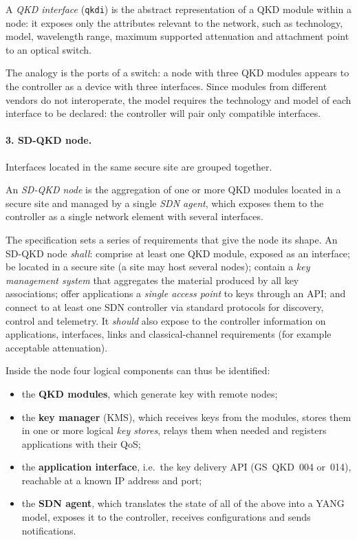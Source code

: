 \begin{definition}
A \emph{QKD interface} (\texttt{qkdi}) is the abstract representation of a
QKD module within a node: it exposes only the attributes relevant to the
network, such as technology, model, wavelength range, maximum supported
attenuation and attachment point to an optical switch.
\end{definition}

The analogy is the ports of a switch: a node with three QKD modules appears
to the controller as a device with three interfaces. Since modules from
different vendors do not interoperate, the model requires the technology
and model of each interface to be declared: the controller will pair only
compatible interfaces.

\paragraph{3. SD-QKD node.}
Interfaces located in the same secure site are grouped together.

\begin{definition}
An \emph{SD-QKD node} is the aggregation of one or more QKD modules located
in a secure site and managed by a single \emph{SDN agent}, which exposes
them to the controller as a single network element with several interfaces.
\end{definition}

The specification sets a series of requirements that give the node its
shape. An SD-QKD node \emph{shall}: comprise at least one QKD module,
exposed as an interface; be located in a secure site (a site may host
several nodes); contain a \emph{key management system} that aggregates the
material produced by all key associations; offer applications a
\emph{single access point} to keys through an API; and connect to at least
one SDN controller via standard protocols for discovery, control and
telemetry. It \emph{should} also expose to the controller information on
applications, interfaces, links and classical-channel requirements (for
example acceptable attenuation).

Inside the node four logical components can thus be identified:
\begin{itemize}
  \item the \textbf{QKD modules}, which generate key with remote nodes;
  \item the \textbf{key manager} (KMS), which receives keys from the
        modules, stores them in one or more logical \emph{key stores},
        relays them when needed and registers applications with their QoS;
  \item the \textbf{application interface}, i.e.\ the key delivery API
        (GS~QKD~004 or~014), reachable at a known IP address and port;
  \item the \textbf{SDN agent}, which translates the state of all of the
        above into a YANG model, exposes it to the controller, receives
        configurations and sends notifications.
\end{itemize}


